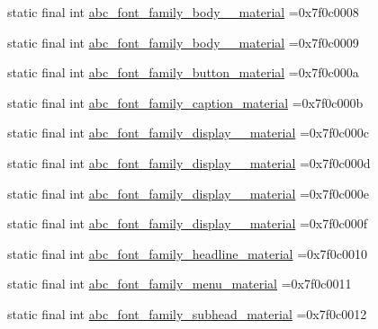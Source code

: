 \begin{DoxyCompactItemize}
\item 
static final int \mbox{\hyperlink{classcom_1_1example_1_1trainawearapplication_1_1_r_1_1string_aba00958629159341fa3e0a19877194e5}{abc\+\_\+font\+\_\+family\+\_\+body\+\_\+\_\+material}} =0x7f0c0008
\item 
static final int \mbox{\hyperlink{classcom_1_1example_1_1trainawearapplication_1_1_r_1_1string_ade2d812dfcb8fd7246a7ff69a34b83e7}{abc\+\_\+font\+\_\+family\+\_\+body\+\_\+\_\+material}} =0x7f0c0009
\item 
static final int \mbox{\hyperlink{classcom_1_1example_1_1trainawearapplication_1_1_r_1_1string_afa88b6d3c5b93479f788a78a66875ea5}{abc\+\_\+font\+\_\+family\+\_\+button\+\_\+material}} =0x7f0c000a
\item 
static final int \mbox{\hyperlink{classcom_1_1example_1_1trainawearapplication_1_1_r_1_1string_a32ffe2711ae3caa43f1c072d62a55fcf}{abc\+\_\+font\+\_\+family\+\_\+caption\+\_\+material}} =0x7f0c000b
\item 
static final int \mbox{\hyperlink{classcom_1_1example_1_1trainawearapplication_1_1_r_1_1string_a6b62eff8e4d574084d7fdcbb9cc74315}{abc\+\_\+font\+\_\+family\+\_\+display\+\_\+\_\+material}} =0x7f0c000c
\item 
static final int \mbox{\hyperlink{classcom_1_1example_1_1trainawearapplication_1_1_r_1_1string_af88399f6070c7202c53d297c38fdc303}{abc\+\_\+font\+\_\+family\+\_\+display\+\_\+\_\+material}} =0x7f0c000d
\item 
static final int \mbox{\hyperlink{classcom_1_1example_1_1trainawearapplication_1_1_r_1_1string_a00359d1b8377b568b11695f6459f9844}{abc\+\_\+font\+\_\+family\+\_\+display\+\_\+\_\+material}} =0x7f0c000e
\item 
static final int \mbox{\hyperlink{classcom_1_1example_1_1trainawearapplication_1_1_r_1_1string_a7b0183ac58c1d24dff1a4ccd75d8e289}{abc\+\_\+font\+\_\+family\+\_\+display\+\_\+\_\+material}} =0x7f0c000f
\item 
static final int \mbox{\hyperlink{classcom_1_1example_1_1trainawearapplication_1_1_r_1_1string_ac4ff0810ce3929f870bbe2475218e58c}{abc\+\_\+font\+\_\+family\+\_\+headline\+\_\+material}} =0x7f0c0010
\item 
static final int \mbox{\hyperlink{classcom_1_1example_1_1trainawearapplication_1_1_r_1_1string_a07127bd6dfcf640d459a0d7d314d8204}{abc\+\_\+font\+\_\+family\+\_\+menu\+\_\+material}} =0x7f0c0011
\item 
static final int \mbox{\hyperlink{classcom_1_1example_1_1trainawearapplication_1_1_r_1_1string_ac2cd92ca2b5724965c3781d48ee0bbd7}{abc\+\_\+font\+\_\+family\+\_\+subhead\+\_\+material}} =0x7f0c0012

\end{DoxyCompactItemize}
